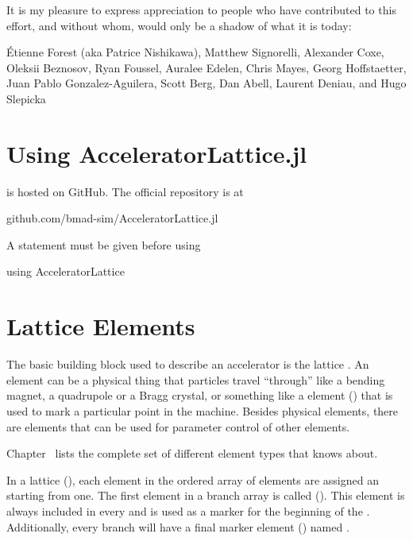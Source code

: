 It is my pleasure to express appreciation to people who have contributed to this effort, and without
whom, \bmadjl would only be a shadow of what it is today: 

\'Etienne Forest (aka Patrice Nishikawa),
Matthew Signorelli,
Alexander Coxe,
Oleksii Beznosov,
Ryan Foussel,
Auralee Edelen,
Chris Mayes,
Georg Hoffstaetter,
Juan Pablo Gonzalez-Aguilera,
Scott Berg,
Dan Abell,
Laurent Deniau, and
Hugo Slepicka

\section{Using AcceleratorLattice.jl}

\accellat is hosted on GitHub. The official repository is at
\begin{example}
  github.com/bmad-sim/AcceleratorLattice.jl
\end{example}

A  statement must be given before using \accellat
\begin{example}
  using AcceleratorLattice
\end{example}

\section{Lattice Elements}
\label{s:element.def}

The basic building block used to describe an accelerator is the lattice . An
element can be a physical thing that particles travel ``through'' like a bending magnet, a
quadrupole or a Bragg crystal, or something like a  element () that is used
to mark a particular point in the machine.  Besides physical elements, there are 
elements that can be used for parameter control of other elements.

Chapter~ lists the complete set of different element types that \bmad knows about.

In a lattice  (), each element in the
ordered array of elements are assigned an 
starting from one. The first element in a branch array
is called  ().
This element is always included in every   and is used as a
marker for the beginning of the .  Additionally, every branch will have a final
marker element () named .

